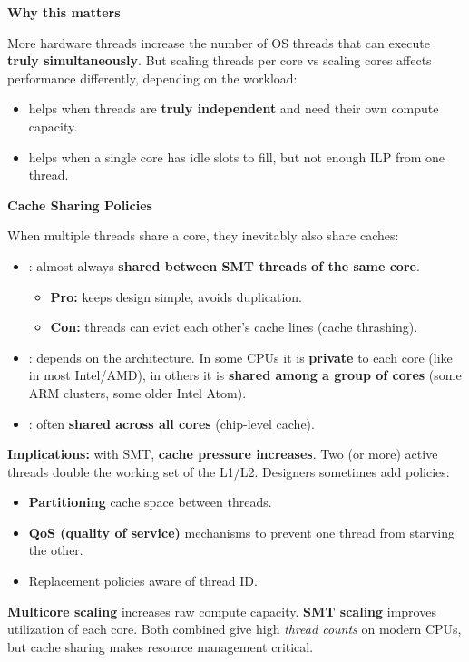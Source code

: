 \newpage

\begin{flushleft}
    \textcolor{Green3}{ \textbf{Why this matters}}
\end{flushleft}
More hardware threads increase the number of OS threads that can execute \textbf{truly simultaneously}. But scaling threads per core vs scaling cores affects performance differently, depending on the workload:
\begin{itemize}
    \item {} helps when threads are \textbf{truly independent} and need their own compute capacity.
    \item {} helps when a single core has idle slots to fill, but not enough ILP from one thread.
\end{itemize}

\highspace
\begin{flushleft}
    \textcolor{Green3}{ \textbf{Cache Sharing Policies}}
\end{flushleft}
When multiple threads share a core, they inevitably also share caches:
\begin{itemize}
    \item {}: almost always \textbf{shared between SMT threads of the same core}.
    \begin{itemize}
        \item[\textcolor{Green3}{\faIcon{check}}] \textcolor{Green3}{\textbf{Pro:}} keeps design simple, avoids duplication.
        \item[\textcolor{Red2}{\faIcon{times}}] \textcolor{Red2}{\textbf{Con:}} threads can evict each other's cache lines (cache thrashing).
    \end{itemize}

    \item {}: depends on the architecture. In some CPUs it is \textbf{private} to each core (like in most Intel/AMD), in others it is \textbf{shared among a group of cores} (some ARM clusters, some older Intel Atom).
    
    \item {}: often \textbf{shared across all cores} (chip-level cache).
\end{itemize}
\textcolor{Red2}{ \textbf{Implications:}} with SMT, \textbf{cache pressure increases}. Two (or more) active threads double the working set of the L1/L2. Designers sometimes add policies:
\begin{itemize}
    \item \textbf{Partitioning} cache space between threads.
    \item \textbf{QoS (quality of service)} mechanisms to prevent one thread from starving the other.
    \item Replacement policies aware of thread ID.
\end{itemize}
\textbf{Multicore scaling} increases raw compute capacity. \textbf{SMT scaling} improves utilization of each core. Both combined give high \emph{thread counts} on modern CPUs, but cache sharing makes resource management critical.